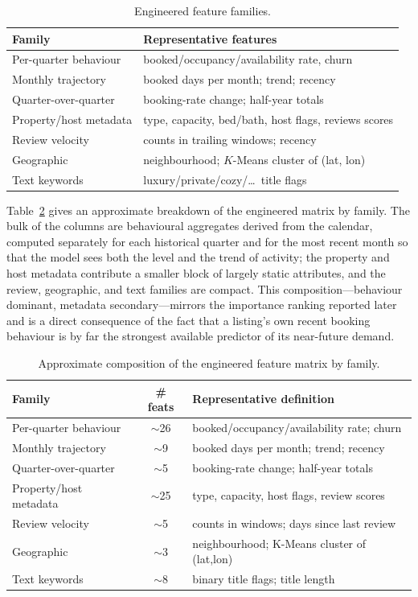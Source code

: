 \documentclass[journal]{IEEEtran}
\begin{document}
\begin{table}[!t]
\caption{Engineered feature families.}
\label{tab:featfam}
\centering
\small
\begin{tabular}{lp{1.55in}}
\toprule
Family & Representative features \\
\midrule
Per-quarter behaviour & booked/occupancy/availability rate, churn \\
Monthly trajectory & booked days per month; trend; recency \\
Quarter-over-quarter & booking-rate change; half-year totals \\
Property/host metadata & type, capacity, bed/bath, host flags, reviews scores \\
Review velocity & counts in trailing windows; recency \\
Geographic & neighbourhood; $K$-Means cluster of (lat, lon) \\
Text keywords & luxury/private/cozy/\dots\ title flags \\
\bottomrule
\end{tabular}
\end{table}

Table~\ref{tab:featinv} gives an approximate breakdown of the engineered matrix by
family. The bulk of the columns are behavioural aggregates derived from the
calendar, computed separately for each historical quarter and for the most recent
month so that the model sees both the level and the trend of activity; the property
and host metadata contribute a smaller block of largely static attributes, and the
review, geographic, and text families are compact. This composition---behaviour
dominant, metadata secondary---mirrors the importance ranking reported later and is
a direct consequence of the fact that a listing's own recent booking behaviour is by
far the strongest available predictor of its near-future demand.

\begin{table}[!t]
\caption{Approximate composition of the engineered feature matrix by family.}
\label{tab:featinv}
\centering
\small
\begin{tabular}{lcp{1.25in}}
\toprule
Family & \# feats & Representative definition \\
\midrule
Per-quarter behaviour & $\sim$26 & booked/occupancy/availability rate; churn \\
Monthly trajectory & $\sim$9 & booked days per month; trend; recency \\
Quarter-over-quarter & $\sim$5 & booking-rate change; half-year totals \\
Property/host metadata & $\sim$25 & type, capacity, host flags, review scores \\
Review velocity & $\sim$5 & counts in windows; days since last review \\
Geographic & $\sim$3 & neighbourhood; K-Means cluster of (lat,lon) \\
Text keywords & $\sim$8 & binary title flags; title length \\
\bottomrule
\end{tabular}
\end{table}
\end{document}
